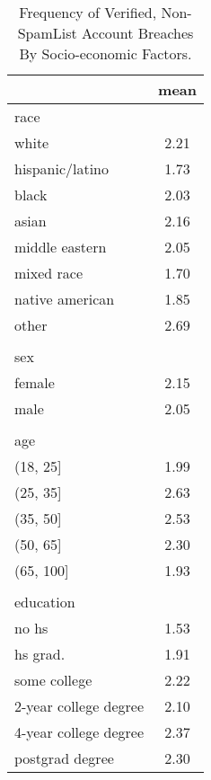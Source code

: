 \documentclass[12pt, letterpaper]{article}
\begin{document}
\begin{table}[h!]
\centering
\caption{Frequency of Verified, Non-SpamList Account Breaches By Socio-economic Factors.}
\begin{tabular}{ l c }
\hline    
 & mean \\
\hline
race   & \\
\hspace{2mm}white            &  2.21\\
\hspace{2mm}hispanic/latino  &  1.73\\
\hspace{2mm}black            &  2.03\\
\hspace{2mm}asian            &  2.16\\
\hspace{2mm}middle eastern   &  2.05\\
\hspace{2mm}mixed race       &  1.70\\
\hspace{2mm}native american  &  1.85\\
\hspace{2mm}other            &  2.69\\
& \\
sex & \\
\hspace{2mm}female          &  2.15\\
\hspace{2mm}male            &  2.05\\
& \\
age & \\
\hspace{2mm}(18, 25]     & 1.99 \\
\hspace{2mm}(25, 35]     & 2.63\\
\hspace{2mm}(35, 50]     & 2.53\\
\hspace{2mm}(50, 65]     & 2.30\\
\hspace{2mm}(65, 100]    & 1.93\\
& \\
education & \\
\hspace{2mm}no hs                 &   1.53\\
\hspace{2mm}hs grad.              &   1.91\\
\hspace{2mm}some college          &   2.22\\
\hspace{2mm}2-year college degree &   2.10\\
\hspace{2mm}4-year college degree &   2.37\\
\hspace{2mm}postgrad degree       &   2.30\\
\hline
\end{tabular}
\label{table:socdem_verified_dat}
\end{table}
\end{document}
